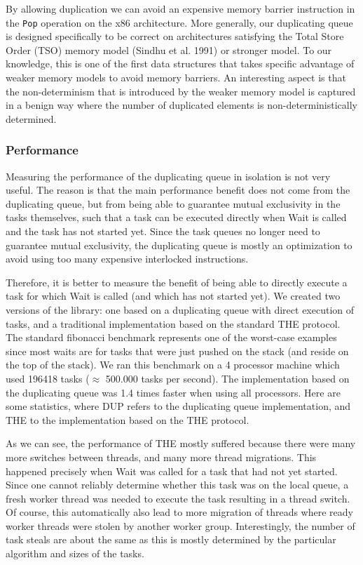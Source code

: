By allowing duplication we can avoid an expensive memory barrier
instruction in the \lstinline!Pop! operation on the x86
architecture. More generally, our duplicating queue is designed
specifically to be correct on architectures satisfying the Total Store
Order (TSO) memory model (Sindhu et al. 1991) or stronger model. To
our knowledge, this is one of the first data structures that takes
specific advantage of weaker memory models to avoid memory
barriers. An interesting aspect is that the non-determinism that is
introduced by the weaker memory model is captured in a benign way
where the number of duplicated elements is non-deterministically
determined.

\subsubsection{Performance}

Measuring the performance of the duplicating queue in isolation is not
very useful. The reason is that the main performance benefit does not
come from the duplicating queue, but from being able to guarantee
mutual exclusivity in the tasks themselves, such that a task can be
executed directly when Wait is called and the task has not started
yet. Since the task queues no longer need to guarantee mutual
exclusivity, the duplicating queue is mostly an optimization to avoid
using too many expensive interlocked instructions.

Therefore, it is better to measure the benefit of being able to
directly execute a task for which Wait is called (and which has not
started yet). We created two versions of the library: one based on a
duplicating queue with direct execution of tasks, and a traditional
implementation based on the standard THE protocol. The standard
fibonacci benchmark represents one of the worst-case examples since
most waits are for tasks that were just pushed on the stack (and
reside on the top of the stack). We ran this benchmark on a 4
processor machine which used 196418 tasks ($\approx$ 500.000 tasks per
second). The implementation based on the duplicating queue was 1.4
times faster when using all processors. Here are some statistics,
where DUP refers to the duplicating queue implementation, and THE to
the implementation based on the THE protocol.

As we can see, the performance of THE mostly suffered because there
were many more switches between threads, and many more thread
migrations. This happened precisely when Wait was called for a task
that had not yet started. Since one cannot reliably determine whether
this task was on the local queue, a fresh worker thread was needed to
execute the task resulting in a thread switch. Of course, this
automatically also lead to more migration of threads where ready
worker threads were stolen by another worker group. Interestingly,
the number of task steals are about the same as this is mostly
determined by the particular algorithm and sizes of the tasks.


